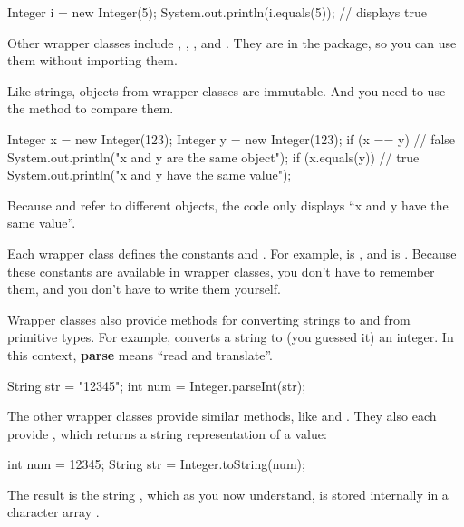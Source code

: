 \begin{code}
Integer i = new Integer(5);
System.out.println(i.equals(5));  // displays true
\end{code}

Other wrapper classes include , , , and .
They are in the  package, so you can use them without importing them.

Like strings, objects from wrapper classes are immutable.
And you need to use the  method to compare them.

\begin{code}
Integer x = new Integer(123);
Integer y = new Integer(123);
if (x == y) {                           // false
    System.out.println("x and y are the same object");
}
if (x.equals(y)) {                      // true
    System.out.println("x and y have the same value");
}
\end{code}

Because  and  refer to different  objects, the code only displays ``x and y have the same value''.

Each wrapper class defines the constants  and .
For example,  is , and  is .
Because these constants are available in wrapper classes, you don't have to remember them, and you don't have to write them yourself.


Wrapper classes also provide methods for converting strings to and from primitive types.
For example,  converts a string to (you guessed it) an integer.
In this context, {\bf parse} means ``read and translate''.

\begin{code}
String str = "12345";
int num = Integer.parseInt(str);
\end{code}

The other wrapper classes provide similar methods, like  and .
They also each provide , which returns a string representation of a value:

\begin{code}
int num = 12345;
String str = Integer.toString(num);
\end{code}

The result is the string , which as you now understand, is stored internally in a character array .

